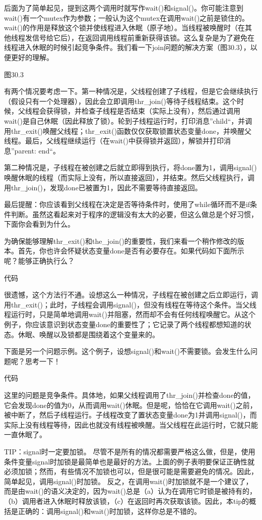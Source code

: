 后面为了简单起见，提到这两个调用时就写作wait()和signal()。你可能注意到wait()有一个mutex作为参数；一般认为这个mutex在调用wait()之前是锁住的。wait()的作用是释放这个锁并使线程进入休眠（原子地）。当线程被唤醒时（在其他线程发信号给它后），在返回调用线程前重新获得该锁。这么复杂是为了避免在线程进入休眠的时候引起竞争条件。我们看一下join问题的解决方案（图30.3），以便更好的理解。

图30.3

有两个情况要考虑一下。第一种情况是，父线程创建了子线程，但是它会继续执行（假设只有一个处理器），因此会立即调用thr\_join()等待子线程结束。这个时候，父线程会获得锁，并检查子线程是否结束（实际上没有），然后通过调用wait()是自己休眠（因此释放了锁）。轮到子线程运行时，打印消息”child“，并调用thr\_exit()唤醒父线程；thr\_exit()函数仅仅获取锁置状态变量done，并唤醒父线程。最后，父线程继续运行（在wait()中获得锁并返回），解锁并打印消息”parent: end“。

第二种情况是，子线程在被创建之后就立即得到执行，将done置为1，调用signal()唤醒休眠的线程（而实际上没有，所以直接返回），并结束。然后父线程执行，调用thr\_join()，发现done已被置为1，因此不需要等待直接返回。

最后提醒：你应该看到父线程在决定是否等待条件时，使用了while循环而不是if条件判断。虽然这看起来对于程序的逻辑没有太大的必要，但这么做总是个好习惯，下面你会看到为什么。

为确保能够理解thr\_exit()和the\_join()的重要性，我们来看一个稍作修改的版本。首先，你也许会怀疑状态变量done是否有必要存在。如果代码如下面所示呢？能够正确执行么？

代码

很遗憾，这个方法行不通。设想这么一种情况，子线程在被创建之后立即运行，调用thr\_exit()；此时，子线程会调用signal()，但没有线程在等待这个条件。当父线程运行时，只是简单地调用wait()并阻塞，然而却不会有任何线程唤醒它。从这个例子，你应该意识到状态变量done的重要性了；它记录了两个线程都想知道的状态。休眠、唤醒以及锁都是围绕着这个变量来的。

下面是另一个问题示例。这个例子，设想signal()和wait()不需要锁。会发生什么问题呢？思考一下！

代码

这里的问题是竞争条件。具体地，如果父线程调用了thr\_join()并检查done的值，它会发现done的值为0，从而调用wait()休眠。但是呢，恰恰在它调用wait()之前，被中断了，然后子线程运行。子线程改变了置状态变量done为1并调用signal()，而实际上没有线程等待，因此也就没有线程被唤醒。当父线程在此运行时，它就只能一直休眠了。

TIP：signal时一定要加锁。
尽管不是所有的情况都需要严格这么做，但是，使用条件变量signal时加锁是最简单也是最好的方法。上面的例子表明要保证正确性就必须加锁；然而，有些情况不加锁也可以，但是很可能是需要避免的情况。因此，简单起见，调用signal()时加锁。
反之，在调用wait()时加锁就不是一个建议了，而是由wait()的语义决定的，因为wait()总是（a）认为在调用它时锁是被持有的，（b）调用者进入休眠时释放该锁，（c）在返回时再次获取该锁。因此，本tip的概括是正确的：调用signal()和wait()时加锁，这样你总是不错的。

